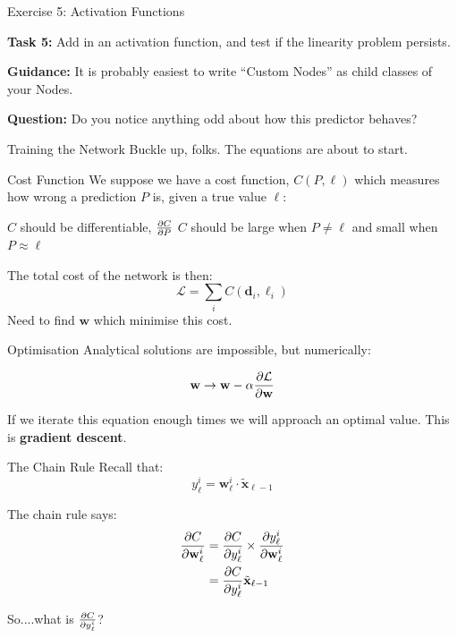 \documentclass[]{SangerLibrary/sanger-present}
\renewcommand\vec[1]{\boldsymbol{\mathbf{#1}}}
\begin{document}
	\begin{frame}{Exercise 5: Activation Functions}
	

		\textbf{Task 5:} Add in an activation function, and test if the linearity problem persists.

		\vspace{1cm}

		\pause \textbf{Guidance:} It is probably easiest to write ``Custom Nodes'' as child classes of your Nodes.
			
		\vspace{1cm}

		\pause \textbf{Question:}  Do you notice anything odd about how this predictor behaves?
	\end{frame}


	\begin{frame}{Training the Network}
		Buckle up, folks. The equations are about to start.
	\end{frame}

	\begin{frame}{Cost Function}
		We suppose we have a cost function, $C(P,\ell)$ which measures how wrong a prediction $P$ is, given a true value $\ell$:
		\begin{itemize}
			\pitem $C$ should be differentiable, $\frac{\partial C}{\partial P}$ 
			\pitem $C$ should be large when $P \neq \ell$ and small when $P \approx \ell$
		\end{itemize}

		\pause The total cost of the network is then:
		\begin{equation}
			\mathcal{L} = \sum_i C(\vec{d}_i,\ell_i)
		\end{equation}
		Need to find $\vec{w}$ which minimise this cost.
	\end{frame}

	\begin{frame}{Optimisation}
		Analytical solutions are impossible, but numerically:

		\begin{equation}
			\vec{w} \to \vec{w} - \alpha \pdiv{ \mathcal{L}}{\vec{w}}
		\end{equation}

		If we iterate this equation enough times we will approach an optimal value. This is \textbf{gradient descent}.
	\end{frame}

	\begin{frame}{The Chain Rule}
		Recall that:
		$$ y_\ell^i = \vec{w}_\ell^i \cdot \tilde{\vec{x}}_{\ell-1}$$

		The chain rule says:
		\begin{align}
			\pdiv{C}{\vec{w}_\ell^i} & = \pdiv{C}{y_\ell^i} \times \pdiv{y_\ell^i}{\vec{w}_\ell^i}
			\\
			& = \pdiv{C}{y_\ell^i} \tilde{\vec{x}}_{\ell-1}
		\end{align}

		\pause So....what is $\frac{\partial C}{\partial y_\ell^i}$?
	\end{frame}
\end{document}
